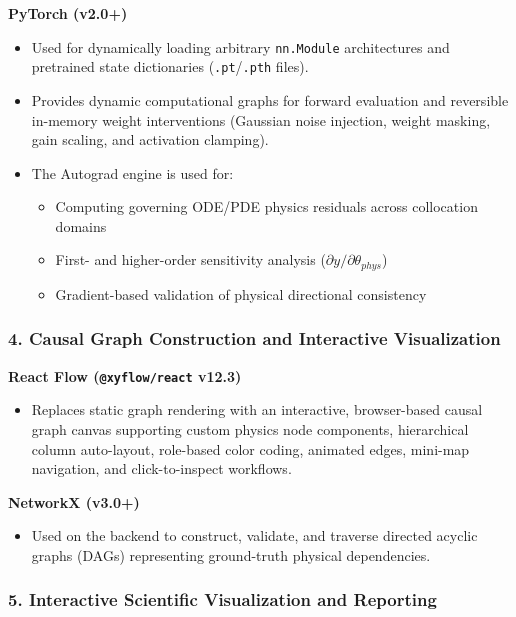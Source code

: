 \documentclass[12pt,singleside,a4paper]{article}
\begin{document}
\textbf{PyTorch (v2.0+)}
\begin{itemize}
    \item Used for dynamically loading arbitrary \texttt{nn.Module} architectures and pretrained state dictionaries (\texttt{.pt}/\texttt{.pth} files).
    \item Provides dynamic computational graphs for forward evaluation and reversible in-memory weight interventions (Gaussian noise injection, weight masking, gain scaling, and activation clamping).
    \item The Autograd engine is used for:
    \begin{itemize}
        \item Computing governing ODE/PDE physics residuals across collocation domains
        \item First- and higher-order sensitivity analysis ($\partial y / \partial \theta_{phys}$)
        \item Gradient-based validation of physical directional consistency
    \end{itemize}
\end{itemize}

\subsubsection{4. Causal Graph Construction and Interactive Visualization}

\textbf{React Flow (\texttt{@xyflow/react} v12.3)}
\begin{itemize}
    \item Replaces static graph rendering with an interactive, browser-based causal graph canvas supporting custom physics node components, hierarchical column auto-layout, role-based color coding, animated edges, mini-map navigation, and click-to-inspect workflows.
\end{itemize}

\textbf{NetworkX (v3.0+)}
\begin{itemize}
    \item Used on the backend to construct, validate, and traverse directed acyclic graphs (DAGs) representing ground-truth physical dependencies.
\end{itemize}

\subsubsection{5. Interactive Scientific Visualization and Reporting}
\end{document}
